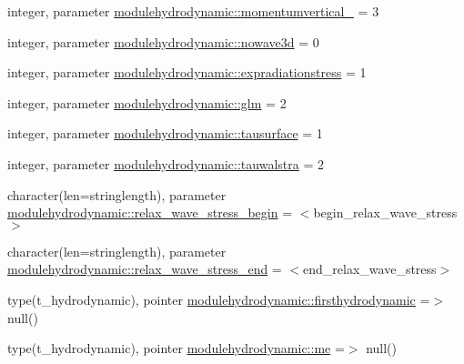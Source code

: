 \begin{DoxyCompactItemize}
\item 
integer, parameter \mbox{\hyperlink{namespacemodulehydrodynamic_a0563947ca0b057d4dc7df6ac00e5b0bf}{modulehydrodynamic\+::momentumvertical\+\_\+}} = 3
\item 
integer, parameter \mbox{\hyperlink{namespacemodulehydrodynamic_aa91ea572ae7bd08e541e522a32ed77a4}{modulehydrodynamic\+::nowave3d}} = 0
\item 
integer, parameter \mbox{\hyperlink{namespacemodulehydrodynamic_abbbd4f40064713967aac1a39bfc4bf05}{modulehydrodynamic\+::expradiationstress}} = 1
\item 
integer, parameter \mbox{\hyperlink{namespacemodulehydrodynamic_a4e69c9379fc556ae0fc21a588195f0a0}{modulehydrodynamic\+::glm}} = 2
\item 
integer, parameter \mbox{\hyperlink{namespacemodulehydrodynamic_a892036fbc22375e1172b30c374287e1a}{modulehydrodynamic\+::tausurface}} = 1
\item 
integer, parameter \mbox{\hyperlink{namespacemodulehydrodynamic_af093f4244521e685178dab331a9ef8a4}{modulehydrodynamic\+::tauwalstra}} = 2
\item 
character(len=stringlength), parameter \mbox{\hyperlink{namespacemodulehydrodynamic_a359bae8796db1f4d86d53da366a97366}{modulehydrodynamic\+::relax\+\_\+wave\+\_\+stress\+\_\+begin}} = \textquotesingle{}$<$begin\+\_\+relax\+\_\+wave\+\_\+stress$>$\textquotesingle{}
\item 
character(len=stringlength), parameter \mbox{\hyperlink{namespacemodulehydrodynamic_a0aa6ff4d2a7a8beb497a742c1455435e}{modulehydrodynamic\+::relax\+\_\+wave\+\_\+stress\+\_\+end}} = \textquotesingle{}$<$end\+\_\+relax\+\_\+wave\+\_\+stress$>$\textquotesingle{}
\item 
type(t\+\_\+hydrodynamic), pointer \mbox{\hyperlink{namespacemodulehydrodynamic_ade799e46b48fe9cce4b1d0557b736f07}{modulehydrodynamic\+::firsthydrodynamic}} =$>$ null()
\item 
type(t\+\_\+hydrodynamic), pointer \mbox{\hyperlink{namespacemodulehydrodynamic_aa15498bfec419d54a902a53a6eaece07}{modulehydrodynamic\+::me}} =$>$ null()
\end{DoxyCompactItemize}
